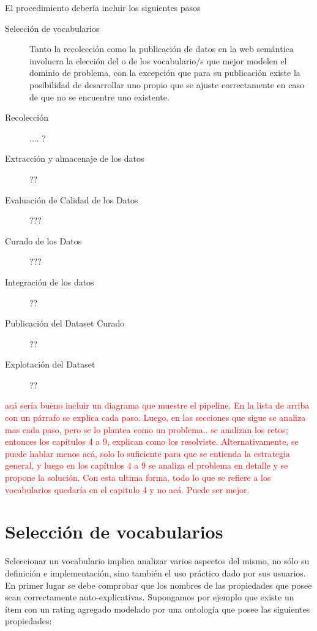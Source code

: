 El procedimiento debería incluir los siguientes pasos  

\begin{description}
\item[Selección de vocabularios ] Tanto la recolección como la publicación de datos en la web semántica involucra la elección del o de los vocabulario/s que mejor modelen el dominio de problema, con la excepción que para su publicación existe la posibilidad de desarrollar uno propio que se ajuste correctamente en caso de que no se encuentre uno existente. 
\item[Recolección  ] .... ?
\item[Extracción y almacenaje de los datos] ??
\item[Evaluación de Calidad de los Datos] ???
\item[Curado de los Datos] ???
\item[Integración de los datos] ?? 
\item[Publicación del Dataset Curado] ?? 
\item[Explotación del Dataset] ?? 
\end{description}

\begin{framed}
\textcolor{red}{acá sería bueno incluir un diagrama que muestre el pipeline. En la lista de arriba con un párrafo se explica cada paso. Luego, en las secciones que sigue se analiza mas cada paso, pero se lo plantea como un problema.. se analizan los retos; entonces los capítulos 4 a 9, explican como los resolviste. Alternativamente, se puede hablar menos acá, solo lo suficiente para que se entienda la estrategia general, y luego en los capítulos 4 a 9 se analiza el problema en detalle y se propone la solución. Con esta ultima forma, todo lo que se refiere a los vocabularios quedaría en el capitulo 4 y no acá. Puede ser mejor.}
\end{framed}


\section{Selección de vocabularios}

Seleccionar un vocabulario implica analizar varios aspectos del mismo, no sólo su definición e implementación, sino también el uso práctico dado por sus usuarios. 
En primer lugar se debe comprobar que los nombres de las propiedades que posee sean correctamente auto-explicativas. Supongamos por ejemplo que existe un ítem con un rating agregado modelado por una ontología que posee las siguientes propiedades:

